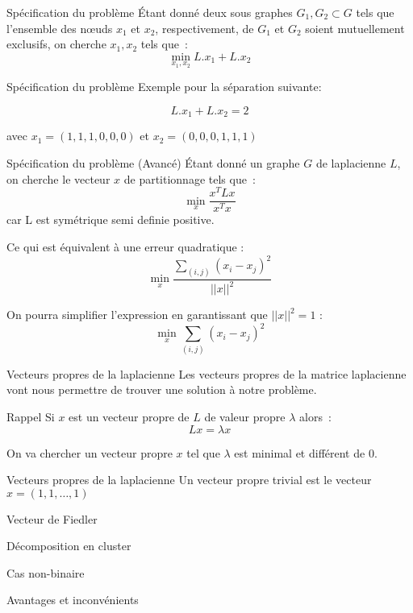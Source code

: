 \begin{frame}{Spécification du problème}
    Étant donné deux sous graphes $G_1,G_2 \subset G$ tels que l'ensemble des nœuds $x_1$ et $x_2$, respectivement, de $G_1$ et $G_2$ soient mutuellement exclusifs, on cherche $x_1, x_2$ tels que~:
    $$
        \min_{x_1, x_2} L.x_1 + L.x_2
    $$
\end{frame}

\begin{frame}{Spécification du problème}
    Exemple pour la séparation suivante:


    $$
        L.x_1 + L.x_2 = 2
    $$

    avec $x_1 = (1,1,1,0,0,0)$ et $x_2 = (0,0,0,1,1,1)$
\end{frame}

\begin{frame}{Spécification du problème (Avancé)}
    Étant donné un graphe $G$ de laplacienne $L$, on cherche le vecteur $x$ de partitionnage tels que~:
    $$
        \min_{x} \frac{x^T L x}{x^T x}
    $$
    car L est symétrique semi definie positive.

    Ce qui est équivalent à une erreur quadratique :
    $$
        \min_x \frac{\sum_{(i,j)}(x_i-x_j)^2}{||x||^2}
    $$
    
    On pourra simplifier l'expression en garantissant que $||x||^2 = 1$ :
    $$
        \min_x \sum_{(i,j)}(x_i-x_j)^2
    $$
\end{frame}



\begin{frame}{Vecteurs propres de la laplacienne}
    Les vecteurs propres de la matrice laplacienne vont nous permettre de trouver une solution à notre problème.
    
    \begin{alertblock}{Rappel}
        Si $x$ est un vecteur propre de $L$ de valeur propre $\lambda$ alors~:
        $$
            Lx = \lambda x
        $$
    \end{alertblock} 

    On va chercher un vecteur propre $x$ tel que $\lambda$ est minimal et différent de 0.
\end{frame}

\begin{frame}{Vecteurs propres de la laplacienne}
    Un vecteur propre trivial est le vecteur $x=(1,1,\dots ,1 )$
\end{frame}
 
\begin{frame}{Vecteur de Fiedler}
\end{frame}

\begin{frame}{Décomposition en cluster}
\end{frame}

\begin{frame}{Cas non-binaire}
\end{frame}

\begin{frame}{Avantages et inconvénients}
\end{frame}